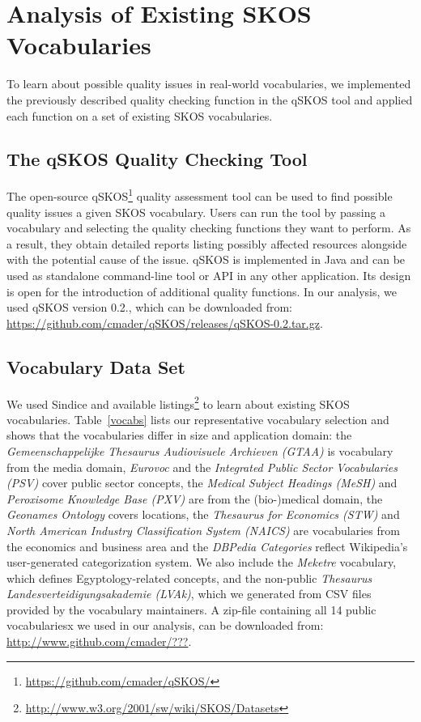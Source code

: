 
\section{Analysis of Existing SKOS Vocabularies}\label{sec:analysis}

To learn about possible quality issues in real-world vocabularies, we implemented the previously described quality checking function in the qSKOS tool and applied each function on a set of existing SKOS vocabularies. 

\subsection{The qSKOS Quality Checking Tool}

The open-source qSKOS\footnote{\url{https://github.com/cmader/qSKOS/}} quality assessment tool can be used to find possible quality issues a given SKOS vocabulary. Users can run the tool by passing a vocabulary and selecting the quality checking functions they want to perform. As a result, they obtain detailed reports listing possibly affected resources alongside with the potential cause of the issue. qSKOS is implemented in Java and can be used as standalone command-line tool or API in any other application. Its design is open for the introduction of additional quality functions. In our analysis, we used qSKOS version 0.2., which can be downloaded from: \url{https://github.com/cmader/qSKOS/releases/qSKOS-0.2.tar.gz}.

\subsection{Vocabulary Data Set}

We used Sindice and available listings\footnote{\url{http://www.w3.org/2001/sw/wiki/SKOS/Datasets}} to learn about existing SKOS vocabularies. Table~\ref{vocabs} lists our representative vocabulary selection and shows that the vocabularies differ in size and application domain: the \emph{Gemeenschappelijke Thesaurus Audiovisuele Archieven (GTAA)} is vocabulary from the media domain, \emph{Eurovoc} and the \emph{Integrated Public Sector Vocabularies (PSV)} cover public sector concepts, the \emph{Medical Subject Headings (MeSH)} and \emph{Peroxisome Knowledge Base (PXV)} are from the (bio-)medical domain, the \emph{Geonames Ontology} covers locations, the \emph{Thesaurus for Economics (STW)} and \emph{North American Industry Classification System (NAICS)} are vocabularies from the economics and business area and the \emph{DBPedia Categories} reflect Wikipedia's user-generated categorization system. We also include the \emph{Meketre} vocabulary, which defines Egyptology-related concepts, and the non-public \emph{Thesaurus Landesverteidigungsakademie (LVAk)}, which we generated from CSV files provided by the vocabulary maintainers. A zip-file containing all 14 public vocabulariesx we used in our analysis, can be downloaded from: \url{http://www.github.com/cmader/???}.

